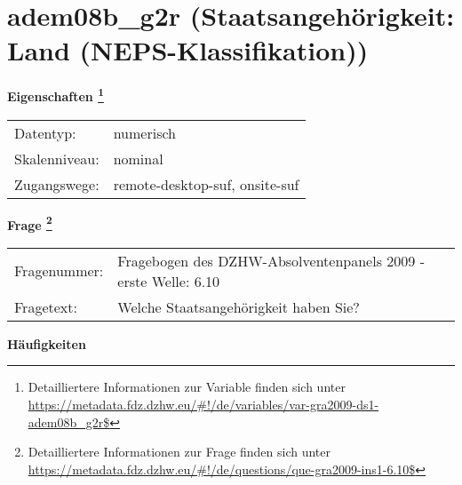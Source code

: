 
    \setcounter{footnote}{0}

    \vspace*{-1.8cm}
	\section{adem08b\_g2r (Staatsangehörigkeit: Land (NEPS-Klassifikation))}
	\label{section:adem08b_g2r}



    \vspace*{0.5cm}
    \noindent\textbf{Eigenschaften
	\footnote{Detailliertere Informationen zur Variable finden sich unter
		\url{https://metadata.fdz.dzhw.eu/\#!/de/variables/var-gra2009-ds1-adem08b_g2r$}}}\\
	\begin{tabularx}{\hsize}{@{}lX}
	Datentyp: & numerisch \\
	Skalenniveau: & nominal \\
	Zugangswege: &
	  remote-desktop-suf, 
	  onsite-suf
 \\
    \end{tabularx}



				\vspace*{0.5cm}
                \noindent\textbf{Frage
	                \footnote{Detailliertere Informationen zur Frage finden sich unter
		              \url{https://metadata.fdz.dzhw.eu/\#!/de/questions/que-gra2009-ins1-6.10$}}}\\
				\begin{tabularx}{\hsize}{@{}lX}
					Fragenummer: &
					  Fragebogen des DZHW-Absolventenpanels 2009 - erste Welle:
					  6.10
 \\
					Fragetext: & Welche Staatsangehörigkeit haben Sie? \\
				\end{tabularx}





        		\vspace*{0.5cm}
                \noindent\textbf{Häufigkeiten}

